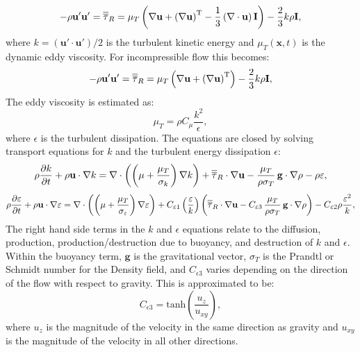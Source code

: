 \begin{equation}\label{eq:R_tensor_compressible}
  -\rho\mathbf{u}'\mathbf{u}' = \overline{\overline{\tau}}_R = \mu_T \left( \nabla\mathbf{u} + \left(\nabla\mathbf{u}\right)^{\mathrm{T}} - \frac{1}{3}\left(\nabla\cdot\mathbf{u}\right)\mathbf{I} \right) - \frac{2}{3} k\rho\mathbf{I},
\end{equation}
where $k=(\mathbf{u}'\cdot\mathbf{u}')/2$ is the turbulent kinetic energy and
$\mu_T(\mathbf{x},t)$ is the dynamic eddy viscosity. For incompressible flow this becomes:
\begin{equation}\label{eq:R_tensor_incompressible}
  -\rho\mathbf{u}'\mathbf{u}' = \overline{\overline{\tau}}_R = \mu_T \left( \nabla\mathbf{u} + \left(\nabla\mathbf{u}\right)^{\mathrm{T}} \right) - \frac{2}{3} k\rho\mathbf{I},
\end{equation}
The eddy viscosity is estimated as:
\begin{equation}\label{eq:nut}
  \mu_T = \rho C_\mu \frac{k^2}{\epsilon},
\end{equation}
where $\epsilon$ is the turbulent dissipation. The equations are closed by solving
transport equations for $k$ and the turbulent energy dissipation $\epsilon$:
\begin{equation}\label{eq:k}
  \rho\frac{\partial k}{\partial t} + \rho\mathbf{u}\cdot\nabla k = \nabla\cdot\left(\left(\mu + \frac{\mu_T}{\sigma_k}\right) \nabla k \right) + \overline{\overline{\tau}}_R \cdot \nabla\mathbf{u} - \frac{\mu_T}{\rho\sigma_T} \, \mathbf{g}\cdot\nabla\rho - \rho \varepsilon ,
\end{equation}
\begin{equation}\label{eq:eps}
  \rho\frac{\partial \varepsilon}{\partial t} + \rho\mathbf{u}\cdot\nabla \varepsilon = \nabla\cdot\left(\left(\mu + \frac{\mu_T}{\sigma_\varepsilon}\right) \nabla{\varepsilon} \right) + C_{\varepsilon1} \left( \frac{\varepsilon}{k} \right) \left( \overline{\overline{\tau}}_R \cdot \nabla\mathbf{u} - C_{\varepsilon3} \, \frac{\mu_T}{\rho\sigma_T} \, \mathbf{g}\cdot\nabla\rho \right)- C_{\varepsilon2} \rho \frac{\varepsilon^2}{k} ,
\end{equation}
The right hand side terms in the $k$ and $\epsilon$ equations relate to the diffusion,
production, production/destruction due to buoyancy, and destruction of $k$ and $\epsilon$.
Within the buoyancy term, $\mathbf{g}$ is the gravitational vector, $\sigma_T$ is the
Prandtl or Schmidt number for the Density field, and $C_{\epsilon3}$ varies depending on
the direction of the flow with respect to gravity.  This is approximated to be:
\begin{equation}\label{eq:Cepsilon3}
  C_{\epsilon3} = \mathrm{tanh}\left ( \frac{u_z}{u_{xy}}  \right ),
\end{equation}
where $u_z$ is the magnitude of the velocity in the same direction as gravity and $u_{xy}$
is the magnitude of the velocity in all other directions.

